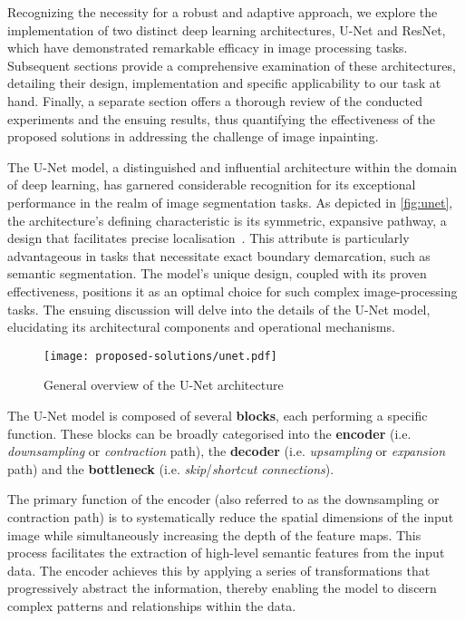 \label{section:solutions}

Recognizing the necessity for a robust and adaptive approach, we explore the implementation of two distinct deep learning architectures, U-Net and ResNet, which have demonstrated remarkable efficacy in image processing tasks. Subsequent sections provide a comprehensive examination of these architectures, detailing their design, implementation and specific applicability to our task at hand. Finally, a separate section offers a thorough review of the conducted experiments and the ensuing results, thus quantifying the effectiveness of the proposed solutions in addressing the challenge of image inpainting.


The U-Net model, a distinguished and influential architecture within the domain of deep learning, has garnered considerable recognition for its exceptional performance in the realm of image segmentation tasks. As depicted in \autoref{fig:unet}, the architecture's defining characteristic is its symmetric, expansive pathway, a design that facilitates precise localisation~\supercite{unet}. This attribute is particularly advantageous in tasks that necessitate exact boundary demarcation, such as semantic segmentation. The model's unique design, coupled with its proven effectiveness, positions it as an optimal choice for such complex image-processing tasks. The ensuing discussion will delve into the details of the U-Net model, elucidating its architectural components and operational mechanisms.

\begin{figure}[ht]
    \centering
    \texttt{[image: proposed-solutions/unet.pdf]}
    \caption{General overview of the U-Net architecture}
    \label{fig:unet}
\end{figure}

The U-Net model is composed of several \textbf{blocks}, each performing a specific function. These blocks can be broadly categorised into the \textbf{encoder} (i.e. \textit{downsampling} or \textit{contraction} path), the \textbf{decoder} (i.e. \textit{upsampling} or \textit{expansion} path) and the \textbf{bottleneck} (i.e. \textit{skip}/\textit{shortcut connections}).


The primary function of the encoder (also referred to as the downsampling or contraction path) is to systematically reduce the spatial dimensions of the input image while simultaneously increasing the depth of the feature maps. This process facilitates the extraction of high-level semantic features from the input data. The encoder achieves this by applying a series of transformations that progressively abstract the information, thereby enabling the model to discern complex patterns and relationships within the data.

